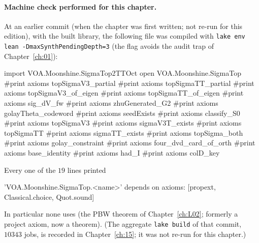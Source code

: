 \paragraph{Machine check performed for this chapter.} At an earlier commit (when the chapter was first written; not re-run for this edition), with the built
library, the following file was compiled with \texttt{lake env lean -DmaxSynthPendingDepth=3}
(the flag avoids the audit trap of Chapter~\ref{ch:01}):
\begin{plaincode}
import VOA.Moonshine.SigmaTop2TTOct
open VOA.Moonshine.SigmaTop
#print axioms topSigmaV3_partial
#print axioms topSigmaTT_partial
#print axioms topSigmaV3_of_eigen
#print axioms topSigmaTT_of_eigen
#print axioms sig_dV_fw
#print axioms zhuGenerated_G2
#print axioms golayTheta_codeword
#print axioms seedExists
#print axioms classify_S0
#print axioms topSigmaV3
#print axioms sigmaV3T_exists
#print axioms topSigmaTT
#print axioms sigmaTT_exists
#print axioms topSigma_both
#print axioms golay_constraint
#print axioms four_dvd_card_of_orth
#print axioms base_identity
#print axioms had_I
#print axioms colD_key
\end{plaincode}
Every one of the $19$ lines printed
\begin{plaincode}
'VOA.Moonshine.SigmaTop.<name>' depends on axioms: [propext, Classical.choice, Quot.sound]
\end{plaincode}
In particular none uses  (the PBW theorem of Chapter~\ref{ch:L02}; formerly a project axiom, now a theorem). (The aggregate \texttt{lake build} of that
commit, $10343$ jobs, is recorded in Chapter~\ref{ch:15}; it was not re-run for this chapter.)

